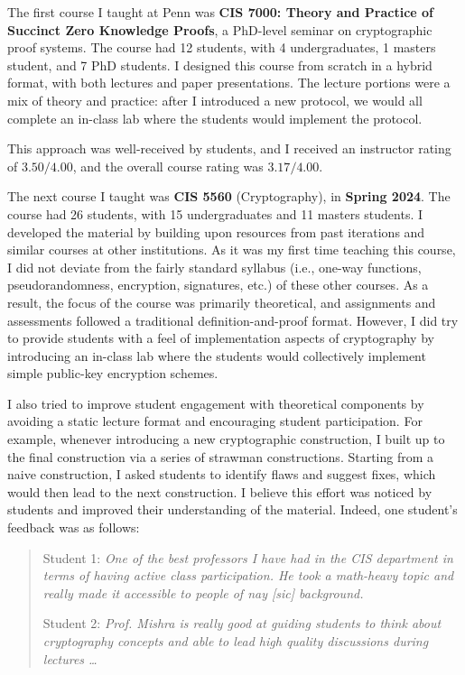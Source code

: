 \documentclass[11pt,letterpaper]{article}
\begin{document}
The first course I taught at Penn was \textbf{CIS 7000: Theory and Practice of Succinct Zero Knowledge Proofs}, a PhD-level seminar on cryptographic proof systems.
The course had 12 students, with 4 undergraduates, 1 masters student, and 7 PhD students.
I designed this course from scratch in a hybrid format, with both lectures and paper presentations.
The lecture portions were a mix of theory and practice: after I introduced a new protocol, we would all complete an in-class lab where the students would implement the protocol.

This approach was well-received by students, and I received an instructor rating of $3.50/4.00$, and the overall course rating was $3.17/4.00$.

The next course I taught was \textbf{CIS 5560} (Cryptography), in \textbf{Spring 2024}. 
The course had 26 students, with 15 undergraduates and 11 masters students.
I developed the material by building upon resources from past iterations and similar courses at other institutions.
As it was my first time teaching this course, I did not deviate from the fairly standard syllabus (i.e., one-way functions, pseudorandomness, encryption, signatures, etc.) of these other courses.
As a result, the focus of the course was primarily theoretical, and assignments and assessments followed a traditional definition-and-proof format.
However, I did try to provide students with a feel of implementation aspects of cryptography by introducing an in-class lab where the students would collectively implement simple public-key encryption schemes.

I also tried to improve student engagement with theoretical components by avoiding a static lecture format and encouraging student participation.
For example, whenever introducing a new cryptographic construction, I built up to the final construction via a series of strawman constructions.
Starting from a naive construction, I asked students to identify flaws and suggest fixes, which would then lead to the next construction.
I believe this effort was noticed by students and improved their understanding of the material. Indeed, one student's feedback was as follows:
\begin{quotation}
  Student 1: \emph{One of the best professors I have had in the CIS department in terms of having active class participation. He took a math-heavy topic and really made it accessible to people of nay [sic] background.}
  
  Student 2: \emph{Prof. Mishra is really good at guiding students to think about cryptography concepts and able to lead high quality discussions during lectures \dots}
\end{quotation}
\end{document}
